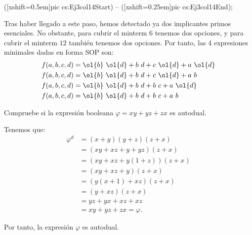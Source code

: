 \begin{ejercicio}
\begin{description}
\begin{table}[H]
              ([xshift=0.5em]pic cs:Ej3col14Start) -- ([xshift=0.25em]pic cs:Ej3col14End);
        \end{table}

        Tras haber llegado a este paso, hemos detectado ya dos implicantes primos esenciales. No obstante, para cubrir el minterm $6$ tenemos dos opciones,
        y para cubrir el minterm $12$ también tenemos dos opciones. Por tanto, las 4 expresiones minimales dadas en forma SOP son:
        \begin{align*}
            f(a,b,c,d) &= \ol{b}~\ol{d} + b~d + c~\ol{d} + a~\ol{d}\\
            f(a,b,c,d) &= \ol{b}~\ol{d} + b~d + c~\ol{d} + a~b\\
            f(a,b,c,d) &= \ol{b}~\ol{d} + b~d + b~c + a~\ol{d}\\
            f(a,b,c,d) &= \ol{b}~\ol{d} + b~d + b~c + a~b
        \end{align*}
    \end{description}
\end{ejercicio}

\begin{ejercicio}
    Compruebe si la expresión booleana $\varphi=xy+yz+zx$ es autodual.

    Tenemos que:
    \begin{align*}
        \varphi^d &= (x+y)(y+z)(z+x)\\
        &= (xy + xz + y + yz)(z + x)\\
        &= (xy + xz + y(1+z))(z + x)\\
        &= (xy + xz + y)(z + x)\\
        &= (y(x+1) + xz)(z + x)\\
        &= (y + xz)(z + x)\\
        &= yz + yx + xz + xz\\
        &= xy + yz + zx = \varphi.
    \end{align*}

    Por tanto, la expresión $\varphi$ es autodual.
\end{ejercicio}